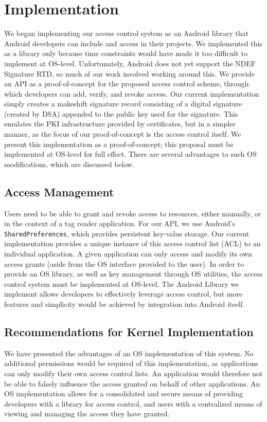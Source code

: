 \documentclass[12pt]{article}
\begin{document}
\section{Implementation}
We began implementing our access control system as an Android library that Android developers can include and access in their projects.
We implemented this as a library only because time constraints would have made it too difficult to implement at OS-level.
Unfortunately, Android does not yet support the NDEF Signature RTD, so much of our work involved working around this.
We provide an API as a proof-of-concept for the proposed access control scheme, through which developers can add, verify, and revoke access.
Our current implementation simply creates a makeshift signature record consisting of a digital signature (created by DSA) appended to the public key used for the signature.
This emulates the PKI infrastructure provided by certificates, but in a simpler manner, as the focus of our proof-of-concept is the access control itself.
We present this implementation as a proof-of-concept; this proposal must be implemented at OS-level for full effect.
There are several advantages to such OS modifications, which are discussed below.

\subsection{Access Management}
Users need to be able to grant and revoke access to resources, either manually, or in the context of a tag reader application.
For our API, we use Android's \texttt{SharedPreferences}, which provides persistent key-value storage.
Our current implementation provides a unique instance of this access control list (ACL) to an individual application.
A given application can only access and modify its own access grants (aside from the OS interface provided to the user).
In order to provide an OS library, as well as key management through OS utilities, the access control system must be implemented at OS-level.
The Android Library we implement allows developers to effectively leverage access control, but more features and simplicity would be achieved by integration into Android itself.

\subsection{Recommendations for Kernel Implementation}
We have presented the advantages of an OS implementation of this system.
No additional permissions would be required of this implementation, as applications can only modify their own access control lists.
An application would therefore not be able to falsely influence the access granted on behalf of other applications.
An OS implementation allows for a consolidated and secure means of providing developers with a library for access control, and users with a centralized means of viewing and managing the access they have granted.
\end{document}
